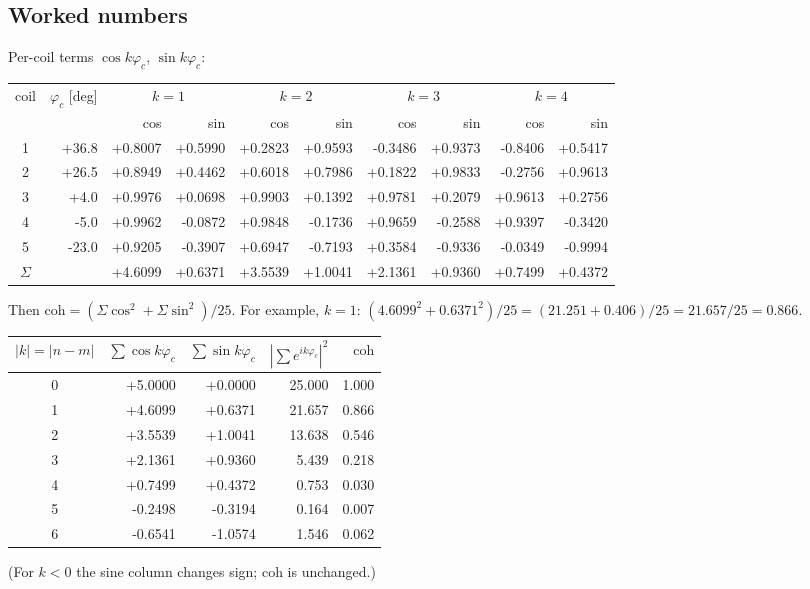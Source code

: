 \documentclass[11pt]{article}
\begin{document}
\subsection*{Worked numbers}
Per-coil terms $\cos k\varphi_c$, $\sin k\varphi_c$:

\begin{center}\small
\begin{tabular}{c r *{4}{r r}}
\toprule
coil & $\varphi_c$ [deg] & \multicolumn{2}{c}{$k=1$} & \multicolumn{2}{c}{$k=2$} & \multicolumn{2}{c}{$k=3$} & \multicolumn{2}{c}{$k=4$}\\
 & & cos & sin & cos & sin & cos & sin & cos & sin\\
\midrule
1 & +36.8 & +0.8007 & +0.5990 & +0.2823 & +0.9593 & -0.3486 & +0.9373 & -0.8406 & +0.5417 \\
2 & +26.5 & +0.8949 & +0.4462 & +0.6018 & +0.7986 & +0.1822 & +0.9833 & -0.2756 & +0.9613 \\
3 & +4.0 & +0.9976 & +0.0698 & +0.9903 & +0.1392 & +0.9781 & +0.2079 & +0.9613 & +0.2756 \\
4 & -5.0 & +0.9962 & -0.0872 & +0.9848 & -0.1736 & +0.9659 & -0.2588 & +0.9397 & -0.3420 \\
5 & -23.0 & +0.9205 & -0.3907 & +0.6947 & -0.7193 & +0.3584 & -0.9336 & -0.0349 & -0.9994 \\
\midrule $\Sigma$ & & +4.6099 & +0.6371 & +3.5539 & +1.0041 & +2.1361 & +0.9360 & +0.7499 & +0.4372 \\
\bottomrule
\end{tabular}
\end{center}

Then $\mathrm{coh} = (\Sigma\cos^2 + \Sigma\sin^2)/25$. For example, $k=1$:
$(4.6099^2 + 0.6371^2)/25 = (21.251 + 0.406)/25 = 21.657/25 = 0.866$.

\begin{center}
\begin{tabular}{c r r r r}
\toprule
$|k|=|n-m|$ & $\sum\cos k\varphi_c$ & $\sum\sin k\varphi_c$ & $|\sum e^{ik\varphi_c}|^2$ & $\mathrm{coh}$ \\
\midrule
0 & +5.0000 & +0.0000 & 25.000 & 1.000 \\
1 & +4.6099 & +0.6371 & 21.657 & 0.866 \\
2 & +3.5539 & +1.0041 & 13.638 & 0.546 \\
3 & +2.1361 & +0.9360 & 5.439 & 0.218 \\
4 & +0.7499 & +0.4372 & 0.753 & 0.030 \\
5 & -0.2498 & -0.3194 & 0.164 & 0.007 \\
6 & -0.6541 & -1.0574 & 1.546 & 0.062 \\
\bottomrule
\end{tabular}
\end{center}
(For $k<0$ the sine column changes sign; $\mathrm{coh}$ is unchanged.)
\end{document}
